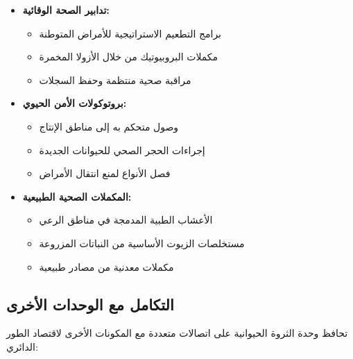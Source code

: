 \begin{itemize}
    \item \textbf{تدابير الصحة الوقائية:}
    \begin{itemize}
        \item برامج التطعيم الاستراتيجية للأمراض المتوطنة
        \item مكملات البروبيوتيك من خلال الأزولا المخمرة
        \item مراقبة صحية منتظمة وحفظ السجلات
    \end{itemize}
    
    \item \textbf{بروتوكولات الأمن الحيوي:}
    \begin{itemize}
        \item وصول متحكم به إلى مناطق الإنتاج
        \item إجراءات الحجر الصحي للحيوانات الجديدة
        \item فصل الأنواع لمنع انتقال الأمراض
    \end{itemize}
    
    \item \textbf{المكملات الصحية الطبيعية:}
    \begin{itemize}
        \item الأعشاب الطبية المدمجة في مناطق الرعي
        \item مستخلصات الزيوت الأساسية من النباتات المزروعة
        \item مكملات معدنية من مصادر طبيعية
    \end{itemize}
\end{itemize}

\subsection{التكامل مع الوحدات الأخرى}

تحافظ وحدة الثروة الحيوانية على اتصالات متعددة مع المكونات الأخرى لاقتصاد الطور الدائري:


